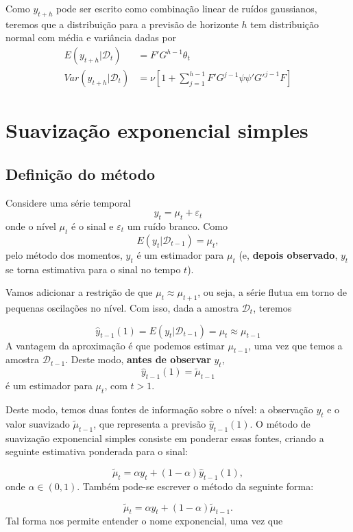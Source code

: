 \documentclass[
  letterpaper,
  DIV=11,
  numbers=noendperiod]{scrartcl}
\theoremstyle{definition}
\theoremstyle{definition}
\theoremstyle{plain}
\theoremstyle{plain}
\theoremstyle{remark}
\begin{document}
Como \(y_{t+h}\) pode ser escrito como combinação linear de ruídos
gaussianos, teremos que a distribuição para a previsão de horizonte
\(h\) tem distribuição normal com média e variância dadas por
\begin{align}
E(y_{t+h}|\mathcal{D}_t)&=F'G^{h-1}\theta_t\\
Var(y_{t+h}|\mathcal{D}_t)&=\nu\left[1+\sum_{j=1}^{h-1}F'G^{j-1}\psi\psi'G'^{j-1}F\right]
\end{align}

\section{Suavização exponencial
simples}\label{suavizauxe7uxe3o-exponencial-simples}

\subsection{Definição do método}\label{definiuxe7uxe3o-do-muxe9todo}

Considere uma série temporal \[y_t = \mu_t+\varepsilon_t\] onde o nível
\(\mu_t\) é o sinal e \(\varepsilon_t\) um ruído branco. Como
\[E(y_t|\mathcal{D}_{t-1})=\mu_t,\] pelo método dos momentos, \(y_t\) é
um estimador para \(\mu_t\) (e, \textbf{depois observado}, \(y_t\) se
torna estimativa para o sinal no tempo \(t\)).

Vamos adicionar a restrição de que \(\mu_t\approx \mu_{t+1}\), ou seja,
a série flutua em torno de pequenas oscilações no nível. Com isso, dada
a amostra \(\mathcal{D}_t\), teremos

\[\hat{y}_{t-1}(1)=E(y_{t}|\mathcal{D}_{t-1})=\mu_{t}\approx \mu_{t-1}\]
A vantagem da aproximação é que podemos estimar \(\mu_{t-1}\), uma vez
que temos a amostra \(\mathcal{D}_{t-1}\). Deste modo, \textbf{antes de
observar} \(y_t\),\\
\[\hat{y}_{t-1}(1)=\tilde{\mu}_{t-1}\] é um estimador para \(\mu_t\),
com \(t>1\).

Deste modo, temos duas fontes de informação sobre o nível: a observação
\(y_t\) e o valor suavizado \(\tilde{\mu}_{t-1}\), que representa a
previsão \(\hat{y}_{t-1}(1)\). O método de suavização exponencial
simples consiste em ponderar essas fontes, criando a seguinte estimativa
ponderada para o sinal:

\[\tilde{\mu}_t=\alpha y_t + (1-\alpha)\hat{y}_{t-1}(1),\] onde
\(\alpha\in(0,1)\). Também pode-se escrever o método da seguinte forma:

\[\tilde{\mu}_t=\alpha y_t + (1-\alpha)\tilde{\mu}_{t-1}.\] Tal forma
nos permite entender o nome exponencial, uma vez que
\end{document}
